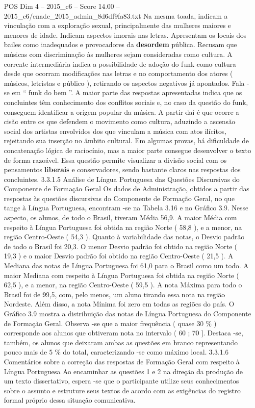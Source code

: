 \begin{textsample}{POS Dim 4 – 2015\_c6 – Score 14.00 – 2015\_c6/enade\_2015\_admin\_8d6df9fa83.txt}
Na mesma toada, indicam a vinculação com a exploração sexual, principalmente das mulheres maiores e menores de idade.
Indicam aspectos imorais nas letras.
Apresentam os locais dos bailes como inadequados e provocadores da \textbf{desordem} pública.
Recusam que músicas com discriminação às mulheres sejam consideradas como cultura.
A corrente intermediária indica a possibilidade de adoção do funk como cultura desde que ocorram modificações nas letras e no comportamento dos atores ( músicos, letristas e público ), retirando os aspectos negativos já apontados.
Fala -se em “ funk do bem ”.
A maior parte das respostas apresentadas indica que os concluintes têm conhecimento dos conflitos sociais e, no caso da questão do funk, conseguem identificar a origem popular da música.
A partir daí é que ocorre a cisão entre os que defendem o movimento como cultura, aduzindo a ascensão social dos artistas envolvidos dos que vinculam a música com atos ilícitos, rejeitando sua inserção no âmbito cultural.
Em algumas provas, há dificuldade de concatenação lógica de raciocínio, mas a maior parte consegue desenvolver o texto de forma razoável.
Essa questão permite visualizar a divisão social com os pensamentos \textbf{liberais} e conservadores, sendo bastante claros nas respostas dos concluintes. 3.3.1.5 Análise de Língua Portuguesa das Questões Discursivas do Componente de Formação Geral Os dados de Administração, obtidos a partir das respostas às questões discursivas do Componente de Formação Geral, no que tange à Língua Portuguesa, encontram -se na Tabela 3.16 e no Gráfico 3.9.
Nesse aspecto, os alunos, de todo o Brasil, tiveram Média 56,9.
A maior Média com respeito à Língua Portuguesa foi obtida na região Norte ( 58,8 ), e a menor, na região Centro-Oeste ( 54,3 ).
Quanto à variabilidade das notas, o Desvio padrão de todo o Brasil foi 20,3.
O menor Desvio padrão foi obtido na região Norte ( 19,3 ) e o maior Desvio padrão foi obtido na região Centro-Oeste ( 21,5 ).
A Mediana das notas de Língua Portuguesa foi 61,0 para o Brasil como um todo.
A maior Mediana com respeito à Língua Portuguesa foi obtida na região Norte ( 62,5 ), e a menor, na região Centro-Oeste ( 59,5 ).
A nota Máxima para todo o Brasil foi de 99,5, com, pelo menos, um aluno tirando essa nota na região Nordeste.
Além disso, a nota Mínima foi zero em todas as regiões do país.
O Gráfico 3.9 mostra a distribuição das notas de Língua Portuguesa do Componente de Formação Geral.
Observa -se que a maior frequência ( quase 30 \% ) corresponde aos alunos que obtiveram nota no intervalo ( 60 ; 70 ].
Destaca -se, também, os alunos que deixaram ambas as questões em branco representando pouco mais de 5 \% do total, caracterizando -se como máximo local. 3.3.1.6 Comentários sobre a correção das respostas de Formação Geral com respeito à Língua Portuguesa Ao encaminhar as questões 1 e 2 na direção da produção de um texto dissertativo, espera -se que o participante utilize seus conhecimentos sobre o assunto e estruture seus textos de acordo com as exigências do registro formal próprio dessa situação comunicativa.

\end{textsample}
